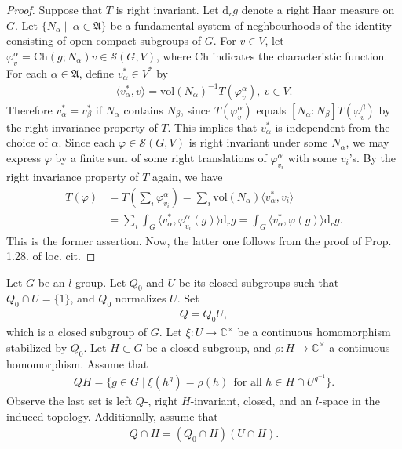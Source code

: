 \documentclass[11pt]{amsart}
\newcommand\vp{\varphi}%
\newcommand\Af{{\mathfrak{A}}}
\newcommand\dr{\mathrm{d}}
\newcommand\C{{\mathbb{C}}}%
\newcommand\Ss{{\mathscr{S}}}
\newcommand\1{\mathbf{1}}
\newcommand\nid{\noindent}
\newcommand\tm{\times}
\newcommand\Ch{{\mathrm{Ch}}}%
\newcommand\vol{{\mathrm{vol}}}
\numberwithin{equation}{section}
\begin{document}
\begin{proof}
Suppose that $T$ is right invariant.
Let $\dr_r g$ denote a right Haar measure on $G$.
Let $\{ N_\alpha \mid \ \alpha \in \Af\}$ be a fundamental system of neghbourhoods of the identity consisting of open compact subgroups of $G$.
For $v \in V$, let $\vp^\alpha_v = \Ch(g; N_\alpha) v \in \Ss(G,V)$, where $\Ch$ indicates the characteristic function.
For each $\alpha \in \Af$, define $v_\alpha^* \in V^*$ by 
\begin{align*}
\langle v_\alpha^*, v \rangle = \vol(N_\alpha)^{-1} T(\vp^\alpha_v), \ v \in V.
\end{align*} 
Therefore $v^*_\alpha = v^*_\beta$ if $N_\alpha$ contains $N_\beta$, since $T(\vp^\alpha_v)$ equals $[N_\alpha:N_\beta]T(\vp^\beta_v)$ by the right invariance property of $T$.
This implies that $v_\alpha^*$ is independent from the choice of $\alpha$.
Since each $\vp \in \Ss(G,V)$ is right invariant under some $N_\alpha$, we may express $\vp$ by a finite sum of some right translations of $\vp_{v_i}^\alpha$ with some $v_i$'s.
By the right invariance property of $T$ again, we have
\begin{align*}
 T(\vp) &= T(\sum_i \vp_{v_i}^\alpha) = \sum_i\vol(N_\alpha) \langle v_\alpha^*, v_i \rangle \\
 &=\sum_i \int_G \langle v_\alpha^*, \vp^\alpha_{v_i}(g) \rangle  \dr_rg = \int_G \langle v_\alpha^*, \vp(g) \rangle  \dr_rg.
\end{align*} 
This is the former assertion.
Now, the latter one follows from the proof of Prop. 1.28. of loc. cit.
\end{proof}
\nid
Let $G$ be an $l$-group.
Let $Q_0$ and $U$ be its closed subgroups such that $Q_0 \cap U = \{1 \}$, and $Q_0$ normalizes $U$.
Set
\begin{align*}
Q = Q_0 U,
\end{align*}  
which is a closed subgroup of $G$.
Let $\xi:U \to \C^\tm$ be a continuous homomorphism stabilized by $Q_0$.
Let $H \subset G$ be a closed subgroup, and $\rho: H \to \C^\tm$ a continuous homomorphism.
Assume that
\begin{align}
QH = \{g \in G \mid \xi(h^g) = \rho(h) \ \  \mbox{for all $h \in H \cap U^{g^{-1}}$} \}. \label{eq:QH}
\end{align}
Observe the last set is left $Q$-, right $H$-invariant, closed, and an $l$-space in the induced topology.
Additionally, assume that 
\begin{align}
Q \cap H = (Q_0 \cap H)(U \cap H). \label{eq:QHst}
\end{align} 
\end{document}
